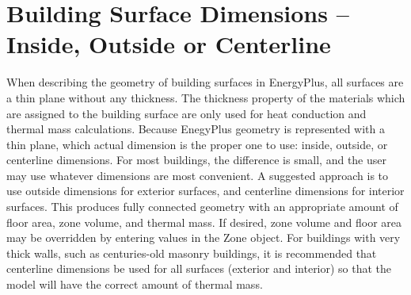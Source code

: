 \section{Building Surface Dimensions -- Inside, Outside or Centerline}\label{building-surface-dimensions-inside-outside-or-centerline}

When describing the geometry of building surfaces in EnergyPlus, all surfaces are a thin plane without any thickness. The thickness property of the materials which are assigned to the building surface are only used for heat conduction and thermal mass calculations. Because EnegyPlus geometry is represented with a thin plane, which actual dimension is the proper one to use: inside, outside, or centerline dimensions. For most buildings, the difference is small, and the user may use whatever dimensions are most convenient. A suggested approach is to use outside dimensions for exterior surfaces, and centerline dimensions for interior surfaces. This produces fully connected geometry with an appropriate amount of floor area, zone volume, and thermal mass. If desired, zone volume and floor area may be overridden by entering values in the Zone object. For buildings with very thick walls, such as centuries-old masonry buildings, it is recommended that centerline dimensions be used for all surfaces (exterior and interior) so that the model will have the correct amount of thermal mass.
